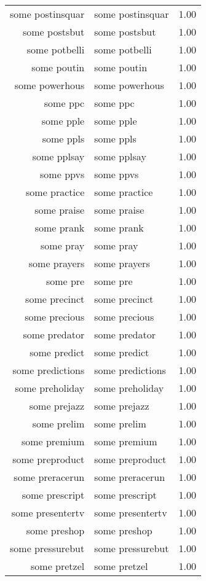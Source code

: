 \begin{table}[ht]
\begin{tabular}{rlr}
  some postinsquar & some postinsquar & 1.00 \\ 
  some postsbut & some postsbut & 1.00 \\ 
  some potbelli & some potbelli & 1.00 \\ 
  some poutin & some poutin & 1.00 \\ 
  some powerhous & some powerhous & 1.00 \\ 
  some ppc & some ppc & 1.00 \\ 
  some pple & some pple & 1.00 \\ 
  some ppls & some ppls & 1.00 \\ 
  some pplsay & some pplsay & 1.00 \\ 
  some ppvs & some ppvs & 1.00 \\ 
  some practice & some practice & 1.00 \\ 
  some praise & some praise & 1.00 \\ 
  some prank & some prank & 1.00 \\ 
  some pray & some pray & 1.00 \\ 
  some prayers & some prayers & 1.00 \\ 
  some pre & some pre & 1.00 \\ 
  some precinct & some precinct & 1.00 \\ 
  some precious & some precious & 1.00 \\ 
  some predator & some predator & 1.00 \\ 
  some predict & some predict & 1.00 \\ 
  some predictions & some predictions & 1.00 \\ 
  some preholiday & some preholiday & 1.00 \\ 
  some prejazz & some prejazz & 1.00 \\ 
  some prelim & some prelim & 1.00 \\ 
  some premium & some premium & 1.00 \\ 
  some preproduct & some preproduct & 1.00 \\ 
  some preracerun & some preracerun & 1.00 \\ 
  some prescript & some prescript & 1.00 \\ 
  some presentertv & some presentertv & 1.00 \\ 
  some preshop & some preshop & 1.00 \\ 
  some pressurebut & some pressurebut & 1.00 \\ 
  some pretzel & some pretzel & 1.00 \\ 

\end{tabular}
\end{table}
